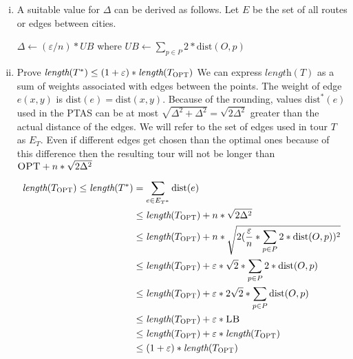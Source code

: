 \begin{enumerate}[(i)]
	\item A suitable value for $\Delta$ can be derived as follows. Let $E$ be the set of all routes or edges between cities.

\begin{sourcecode}
$\Delta \leftarrow (\varepsilon / n) * UB$ where $UB \leftarrow \sum_{p \in P}{2 * \text{dist}(O, p)}$ 
\end{sourcecode}

	\item Prove $\textit{length}(T^*) \leq (1 + \varepsilon) * \textit{length}(T_{\textsc{OPT}})$ We can express $\textit{length}(T)$ as a sum of weights associated with edges between the points. The weight of edge $e(x,y)$ is $\text{dist}(e) = \text{dist}(x,y)$. Because of the rounding, values $\text{dist}^*(e)$ used in the PTAS can be at most $\sqrt{\Delta^2 + \Delta^2} = \sqrt{2\Delta^2}$ greater than the actual distance of the edges. We will refer to the set of edges used in tour $T$ as $E_T$. Even if different edges get chosen than the optimal ones because of this difference then the resulting tour will not be longer than $\textsc{OPT} + n * \sqrt{2\Delta^2}$

\begin{equation}
\begin{split}
\textit{length}(T_{\textsc{OPT}}) \leq \textit{length}(T^*)  &= \sum_{e \in E_{T^*}}{\text{dist}(e)} \\
&\leq \textit{length}(T_{\textsc{OPT}}) + n * \sqrt{2\Delta^2} \\
&\leq \textit{length}(T_{\textsc{OPT}}) + n * \sqrt{2 (\frac{\varepsilon}{n} * \sum_{p \in P}{2 * \text{dist}(O, p)})^2} \\
&\leq \textit{length}(T_{\textsc{OPT}}) + \varepsilon * \sqrt{2} * \sum_{p \in P}{2 * \text{dist}(O, p)} \\
&\leq \textit{length}(T_{\textsc{OPT}}) + \varepsilon * 2\sqrt{2} * \sum_{p \in P}{\text{dist}(O, p)} \\
&\leq \textit{length}(T_{\textsc{OPT}}) + \varepsilon * \textsc{LB}\\
&\leq \textit{length}(T_{\textsc{OPT}}) + \varepsilon * \textit{length}(T_{\textsc{OPT}}) \\
&\leq (1 + \varepsilon) * \textit{length}(T_{\textsc{OPT}}) \\
\end{split}
\end{equation}


\end{enumerate}
